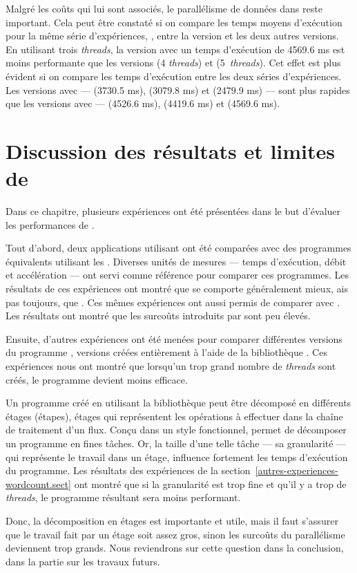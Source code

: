 Malgr\'e les coûts qui lui sont associés, le parall\'elisme de données dans  reste important. Cela peut \^etre constat\'e si on compare les temps moyens d'ex\'ecution pour la m\^eme s\'erie d'exp\'eriences, , entre la version  et les deux autres versions. En utilisant trois \emph{threads}, la version  avec un temps d'ex\'ecution de 4569.6 ms est moins performante que les versions  (4 \emph{threads}) et  (5~\emph{threads}). Cet effet est plus \'evident si on compare les temps d'ex\'ecution entre les deux s\'eries d'exp\'eriences. Les versions avec  --- \ppffs{} (3730.5 ms), \ppff{} (3079.8 ms) et \ppffm{} (2479.9 ms) --- sont plus rapides que les versions avec  --- \ppffs{} (4526.6 ms), \ppff{} (4419.6 ms) et \ppffm{} (4569.6 ms).




\section{Discussion des résultats et limites de \ppff}
\label{limitesppff.sect}

Dans ce chapitre, plusieurs exp\'eriences ont \'et\'e présentées dans le but d'évaluer les performances de .

Tout d'abord, deux applications utilisant  ont \'et\'e compar\'ees avec des programmes  \'equivalents utilisant les . Diverses unit\'es de mesures --– temps d'ex\'ecution, d\'ebit et acc\'elération --- ont servi comme r\'ef\'erence pour comparer ces programmes. Les r\'esultats de ces exp\'eriences ont montr\'e que  se comporte généralement mieux, ais pas toujours, que . 
%
Ces mêmes exp\'eriences ont aussi permis de comparer  avec . Les r\'esultats ont montr\'e que les surco\^uts introduits par  sont peu \'elev\'es.


Ensuite, d'autres exp\'eriences ont \'et\'e men\'ees pour comparer diff\'erentes versions du programme , versions cr\'e\'ees enti\`erement \`a l'aide de la biblioth\`eque .
%
%
Ces expériences nous ont montré que lorsqu'un trop grand nombre de
\emph{threads} sont créés, le programme devient moins efficace.

Un programme cr\'e\'e en utilisant la biblioth\`eque  peut \^etre d\'ecompos\'e en diff\'erents \'etages (\'etapes), \'etages qui repr\'esentent les op\'erations à effectuer dans la cha\^ine de traitement d'un flux. Con\c{c}u dans un style fonctionnel,  permet de d\'ecomposer un programme en fines t\^aches. Or, la taille d'une telle t\^ache --- sa granularit\'e --- qui repr\'esente le travail dans un \'etage, influence fortement les temps d'ex\'ecution du programme. Les r\'esultats des exp\'eriences de la section~\ref{autres-experiences-wordcount.sect} ont montr\'e que si la granularit\'e est trop fine et qu'il y a trop de \emph{threads}, le programme résultant sera moins performant. 

Donc, la d\'ecomposition en \'etages est importante et utile, mais il faut s'assurer que le travail fait par un \'etage soit assez gros, sinon les surco\^uts du parall\'elisme deviennent trop grands.
%
Nous reviendrons sur cette question dans la conclusion, dans la partie sur les travaux futurs.

